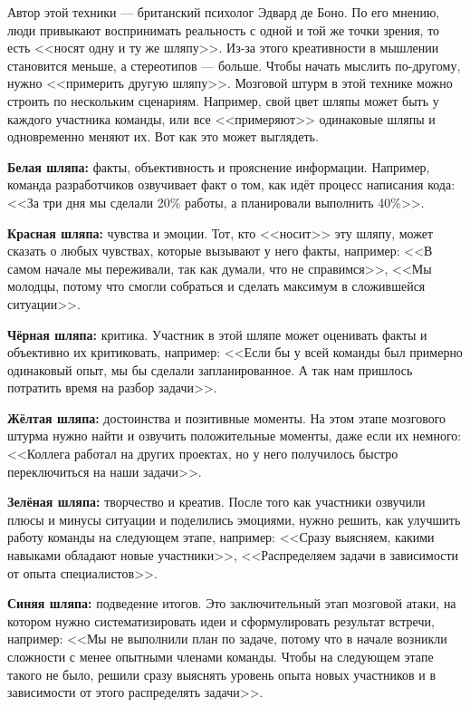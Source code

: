 Автор этой техники — британский психолог Эдвард де Боно. По его мнению, люди привыкают воспринимать реальность с одной и той же точки зрения, то есть <<носят одну и ту же шляпу>>. Из-за этого креативности в мышлении становится меньше, а стереотипов — больше. Чтобы начать мыслить по-другому, нужно <<примерить другую шляпу>>. Мозговой штурм в этой технике можно строить по нескольким сценариям. Например, свой цвет шляпы может быть у каждого участника команды, или все <<примеряют>> одинаковые шляпы и одновременно меняют их. Вот как это может выглядеть.

\textbf{Белая шляпа:} факты, объективность и прояснение информации. Например, команда разработчиков озвучивает факт о том, как идёт процесс написания кода: <<За три дня мы сделали 20\% работы, а планировали выполнить 40\%>>.

\textbf{Красная шляпа:} чувства и эмоции. Тот, кто <<носит>> эту шляпу, может сказать о любых чувствах, которые вызывают у него факты, например: <<В самом начале мы переживали, так как думали, что не справимся>>, <<Мы молодцы, потому что смогли собраться и сделать максимум в сложившейся ситуации>>.

\textbf{Чёрная шляпа:} критика. Участник в этой шляпе может оценивать факты и объективно их критиковать, например: <<Если бы у всей команды был примерно одинаковый опыт, мы бы сделали запланированное. А так нам пришлось потратить время на разбор задачи>>.

\textbf{Жёлтая шляпа:} достоинства и позитивные моменты. На этом этапе мозгового штурма нужно найти и озвучить положительные моменты, даже если их немного: <<Коллега работал на других проектах, но у него получилось быстро переключиться на наши задачи>>.

\textbf{Зелёная шляпа:} творчество и креатив. После того как участники озвучили плюсы и минусы ситуации и поделились эмоциями, нужно решить, как улучшить работу команды на следующем этапе, например: <<Сразу выясняем, какими навыками обладают новые участники>>, <<Распределяем задачи в зависимости от опыта специалистов>>.

\textbf{Синяя шляпа:} подведение итогов. Это заключительный этап мозговой атаки, на котором нужно систематизировать идеи и сформулировать результат встречи, например: <<Мы не выполнили план по задаче, потому что в начале возникли сложности с менее опытными членами команды. Чтобы на следующем этапе такого не было, решили сразу выяснять уровень опыта новых участников и в зависимости от этого распределять задачи>>.
